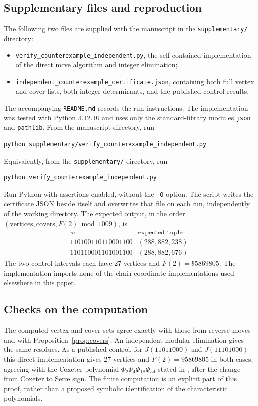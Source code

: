 \documentclass[11pt]{article}
\theoremstyle{definition}
\begin{document}
\subsection*{Supplementary files and reproduction}
The following two files are supplied with the manuscript in the
\texttt{supplementary/} directory:
\begin{itemize}
\item \texttt{verify\_counterexample\_independent.py}, the self-contained
implementation of the direct move algorithm and integer elimination;
\item \texttt{independent\_counterexample\_certificate.json}, containing
both full vertex and cover lists, both integer determinants, and the
published control results.
\end{itemize}
The accompanying \texttt{README.md} records the run instructions.
The implementation was tested with Python 3.12.10 and uses only the
standard-library modules \texttt{json} and \texttt{pathlib}.
From the manuscript directory, run
\begin{verbatim}
python supplementary/verify_counterexample_independent.py
\end{verbatim}
Equivalently, from the \texttt{supplementary/} directory, run
\begin{verbatim}
python verify_counterexample_independent.py
\end{verbatim}
Run Python with assertions enabled, without the \texttt{-O} option.
The script writes the certificate JSON beside itself and overwrites
that file on each run, independently of the working directory.
The expected output, in the order
$(\text{vertices},\text{covers},F(2)\bmod1009)$, is
\[
\begin{array}{c|c}
 w & \text{expected tuple}\\\hline
 110100110110001100 & (288,882,238)\\
 110110001101001100 & (288,882,676)
\end{array}
\]
The two control intervals each have 27 vertices and
$F(2)=95869805$. The implementation imports none of the
chain-coordinate implementations used elsewhere in this paper.

\subsection*{Checks on the computation}
The computed vertex and cover sets agree exactly with those from
reverse moves and with Proposition~\ref{prop:covers}. An independent
modular elimination gives the same residues. As a published control,
for $J(11011000)$ and $J(11101000)$ this direct implementation gives
27 vertices and $F(2)=95869805$ in both cases, agreeing with the Coxeter
polynomial $\Phi_2\Phi_4\Phi_{18}\Phi_{54}$ stated in
\cite[Section 9]{Chapoton}, after the change from Coxeter to Serre sign.
The finite computation is an explicit part of this proof, rather than
a proposed symbolic identification of the characteristic polynomials.
\end{document}

